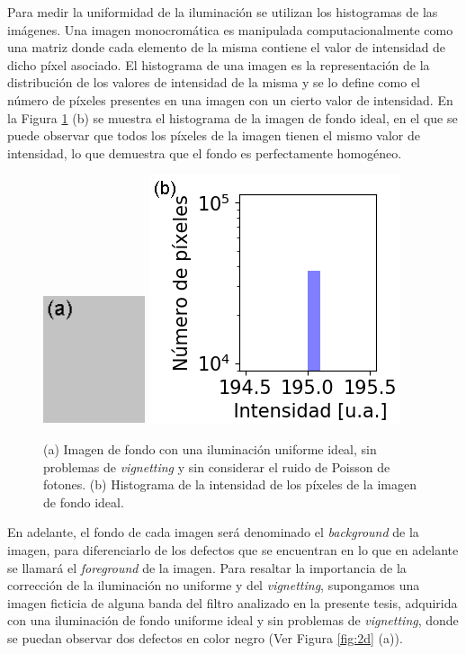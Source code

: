 Para medir la uniformidad de la iluminación se utilizan los histogramas de las imágenes. Una imagen monocromática es manipulada computacionalmente como una matriz donde cada elemento de la misma contiene el valor de intensidad de dicho píxel asociado. El histograma de una imagen es la representación de la distribución de los valores de intensidad de la misma y se lo define como el número de píxeles presentes en una imagen con un cierto valor de intensidad. En la Figura \ref{fig:fon} (b) se muestra el histograma de la imagen de fondo ideal, en el que se puede observar que todos los píxeles de la imagen tienen el mismo valor de intensidad, lo que demuestra que el fondo es perfectamente homogéneo.

\begin{figure}[H]
\hfill%
\includegraphics[width=3.0cm,height=3.8cm]{Figs/defectosZEISS/bg_teorico.png}
\hfill%
\includegraphics[scale=0.8]{Figs/defectosZEISS/hist_bg_teorico.png}
\hfill%
\hfill%
\caption{(a) Imagen de fondo con una iluminación uniforme ideal, sin problemas de \textit{vignetting} y sin considerar el ruido de Poisson de fotones. (b) Histograma de la intensidad de los píxeles de la imagen de fondo ideal.}
\label{fig:fon}
\end{figure}
En adelante, el fondo de cada imagen será denominado el \textit{background} de la imagen, para diferenciarlo de los defectos que se encuentran en lo que en adelante se llamará el \textit{foreground} de la imagen. Para resaltar la importancia de la corrección de la iluminación no uniforme y del \textit{vignetting}, supongamos una imagen ficticia de alguna banda del filtro analizado en la presente tesis, adquirida con una iluminación de fondo uniforme ideal y sin problemas de \textit{vignetting}, donde se puedan observar dos defectos en color negro (Ver Figura \ref{fig:2d} (a)).
